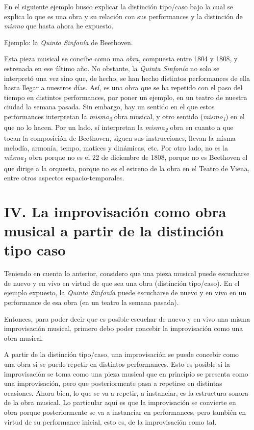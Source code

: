 \documentclass[]{book}
\begin{document}
\begin{refsection}
En el siguiente ejemplo busco explicar la distinción tipo/caso bajo la
cual se explica lo que es una obra y su relación con sus performances y
la distinción de \emph{mismo} que hasta ahora he expuesto.

Ejemplo: la \emph{Quinta Sinfonía} de Beethoven.

Esta pieza musical se concibe como una \emph{obra}, compuesta entre 1804
y 1808, y estrenada en ese último año. No obstante, la \emph{Quinta
Sinfonía} no solo se interpretó una vez sino que, de hecho, se han hecho
distintos performances de ella hasta llegar a nuestros días. Así, es una
obra que se ha repetido con el paso del tiempo en distintos
performances, por poner un ejemplo, en un teatro de nuestra ciudad la
semana pasada. Sin embargo, hay un sentido en el que estos performances
interpretan la \emph{misma\textsubscript{2}} obra musical, y otro
sentido (\emph{mismo\textsubscript{1}}) en el que no lo hacen. Por un
lado, sí interpretan la \emph{misma\textsubscript{2}} obra en cuanto a
que tocan la composición de Beethoven, siguen sus instrucciones, llevan
la misma melodía, armonía, tempo, matices y dinámicas, etc. Por otro
lado, no es la \emph{misma\textsubscript{1}} obra porque no es el 22 de
diciembre de 1808, porque no es Beethoven el que dirige a la orquesta,
porque no es el estreno de la obra en el Teatro de Viena, entre otros
aspectos espacio-temporales.

\section*{IV. La improvisación como obra musical a partir de la distinción
  tipo caso}


Teniendo en cuenta lo anterior, considero que una pieza musical puede
escucharse de nuevo y en vivo en virtud de que sea una obra (distinción
tipo/caso). En el ejemplo expuesto, la \emph{Quinta Sinfonía} puede
escucharse de nuevo y en vivo en un performance de esa obra (en un
teatro la semana pasada).

Entonces, para poder decir que es posible escuchar de nuevo y en vivo
una misma improvisación musical, primero debo poder concebir la
improvisación como una obra musical.

A partir de la distinción tipo/caso, una improvisación se puede concebir
como una obra si se puede repetir en distintos performances. Esto es
posible si la improvisación se toma como una pieza musical que en
principio se presenta como una improvisación, pero que posteriormente
pasa a repetirse en distintas ocasiones. Ahora bien, lo que se va a
repetir, a instanciar, es la estructura sonora de la obra musical. Lo
particular aquí es que la improvisación se convierte en obra porque
posteriormente se va a instanciar en performances, pero también en
virtud de su performance inicial, esto es, de la improvisación como tal.


\end{refsection}
\end{document}
